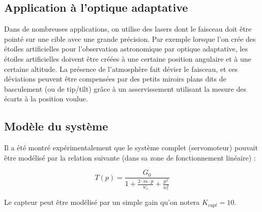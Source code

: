 \documentclass[a4paper,french]{paper}
\begin{document}
\subsection*{Application à l'optique adaptative}

Dans de nombreuses applications, on utilise des lasers dont le faisceau doit être pointé sur une cible avec une grande précision. Par exemple lorsque l'on crée des étoiles artificielles pour l'observation astronomique par optique adaptative, les étoiles artificielles doivent être créées à une certaine position angulaire et à une certaine altitude. La présence de l'atmosphère fait dévier le faisceau, et ces déviations peuvent être compensées par des petits miroirs plans dits de basculement (ou de tip/tilt) grâce à un asservissement utilisant la mesure des écarts à la position voulue.

\subsection*{Modèle du système}

Il a été montré expérimentalement que le système complet (servomoteur) pouvait être modélisé par la relation suivante (dans sa zone de fonctionnement linéaire) :

$$T(p) = \frac{G_0}{1 + \frac{2 \cdot m \cdot p}{w_c} + \frac{p^2}{w_c^2}}$$

Le capteur peut être modélisé par un simple gain qu'on notera $K_{capt} = 10$.

\newpage
\end{document}
